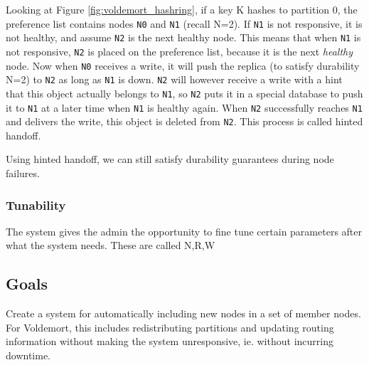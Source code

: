 Looking at Figure \ref{fig:voldemort_hashring}, if a key K hashes to partition 0, the preference list contains nodes \texttt{N0} and \texttt{N1} (recall N=2).
If \texttt{N1} is not responsive, it is not healthy, and assume \texttt{N2} is the next healthy node.
This means that when \texttt{N1} is not responsive, \texttt{N2} is placed on the preference list, because it is the next \emph{healthy} node.
Now when \texttt{N0} receives a write, it will push the replica (to satisfy durability N=2) to \texttt{N2} as long as \texttt{N1} is down.
\texttt{N2} will however receive a write with a hint that this object actually belongs to \texttt{N1}, so \texttt{N2} puts it in a special database to push it to \texttt{N1} at a later time when \texttt{N1} is healthy again. When \texttt{N2} successfully reaches \texttt{N1} and delivers the write, this object is deleted from \texttt{N2}.
This process is called hinted handoff. 

Using hinted handoff, we can still satisfy durability guarantees during node failures.

\subsubsection{Tunability}
The system gives the admin the opportunity to fine tune certain parameters after what the system needs.
These are called N,R,W

\subsection{Goals}
Create a system for automatically including new nodes in a set of member nodes.
For Voldemort, this includes redistributing partitions and updating routing information without making the system unresponsive, ie. without incurring downtime.


